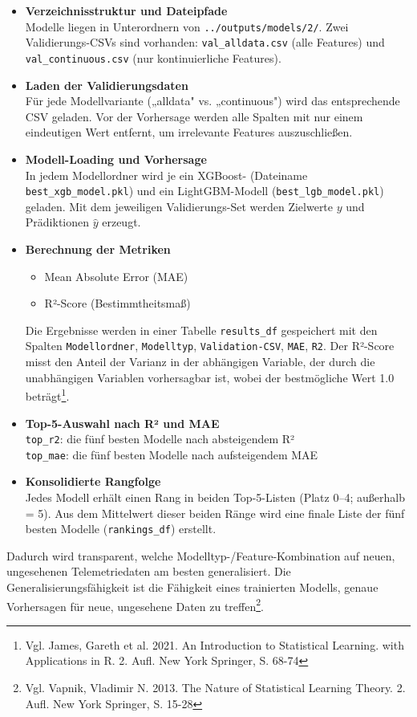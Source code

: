 \begin{itemize}
  \item \textbf{Verzeichnisstruktur und Dateipfade}\\
  Modelle liegen in Unterordnern von \texttt{../outputs/models/2/}. Zwei Validierungs-CSVs sind vorhanden: \texttt{val\_alldata.csv} (alle Features) und \texttt{val\_continuous.csv} (nur kontinuierliche Features).
  
  \item \textbf{Laden der Validierungsdaten}\\
  Für jede Modellvariante („alldata" vs. „continuous") wird das entsprechende CSV geladen. Vor der Vorhersage werden alle Spalten mit nur einem eindeutigen Wert entfernt, um irrelevante Features auszuschließen.
  
  \item \textbf{Modell-Loading und Vorhersage}\\
  In jedem Modellordner wird je ein XGBoost- (Dateiname \texttt{best\_xgb\_model.pkl}) und ein LightGBM-Modell (\texttt{best\_lgb\_model.pkl}) geladen. Mit dem jeweiligen Validierungs-Set werden Zielwerte \(y\) und Prädiktionen \(\hat{y}\) erzeugt.
  
  \item \textbf{Berechnung der Metriken}\\
  \begin{itemize}
    \item Mean Absolute Error (MAE)
    \item R²-Score (Bestimmtheitsmaß)
  \end{itemize}
  Die Ergebnisse werden in einer Tabelle \texttt{results\_df} gespeichert mit den Spalten \texttt{Modellordner}, \texttt{Modelltyp}, \texttt{Validation-CSV}, \texttt{MAE}, \texttt{R2}. Der R²-Score misst den Anteil der Varianz in der abhängigen Variable, der durch die unabhängigen Variablen vorhersagbar ist, wobei der bestmögliche Wert 1.0 beträgt\footnote{Vgl. James, Gareth et al. 2021. An Introduction to Statistical Learning. with Applications in R. 2. Aufl. New York Springer, S. 68-74}.
  
  \item \textbf{Top-5-Auswahl nach R² und MAE}\\
  \texttt{top\_r2}: die fünf besten Modelle nach absteigendem R²\\
  \texttt{top\_mae}: die fünf besten Modelle nach aufsteigendem MAE
  
  \item \textbf{Konsolidierte Rangfolge}\\
  Jedes Modell erhält einen Rang in beiden Top-5-Listen (Platz 0–4; außerhalb = 5). Aus dem Mittelwert dieser beiden Ränge wird eine finale Liste der fünf besten Modelle (\texttt{rankings\_df}) erstellt.
\end{itemize}

\noindent
Dadurch wird transparent, welche Modelltyp-/Feature-Kombination auf neuen, ungesehenen Telemetriedaten am besten generalisiert. Die Generalisierungsfähigkeit ist die Fähigkeit eines trainierten Modells, genaue Vorhersagen für neue, ungesehene Daten zu treffen\footnote{Vgl. Vapnik, Vladimir N. 2013. The Nature of Statistical Learning Theory. 2. Aufl. New York Springer, S. 15-28}.
